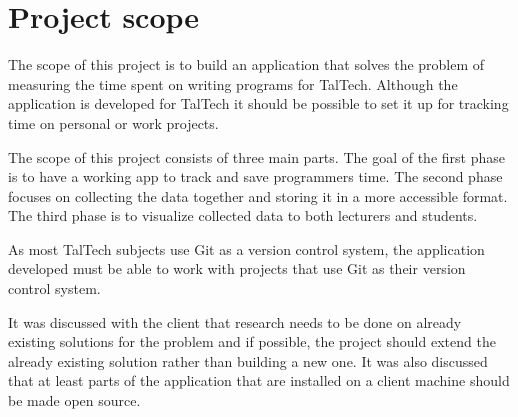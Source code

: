 \section{Project scope}\label{sec:project-scope}
The scope of this project is to build an application that solves the problem of measuring the time spent on writing programs for TalTech.
Although the application is developed for TalTech it should be possible to set it up for tracking time on personal or work projects.

The scope of this project consists of three main parts.
The goal of the first phase is to have a working app to track and save programmers time.
The second phase focuses on collecting the data together and storing it in a more accessible format.
The third phase is to visualize collected data to both lecturers and students.

As most TalTech subjects use Git as a version control system, the application developed must be able to work with
projects that use Git as their version control system.

It was discussed with the client that research needs to be done on already existing solutions for the problem and if possible,
the project should extend the already existing solution rather than building a new one.
It was also discussed that at least parts of the application that are installed on a client machine should be made open source.

